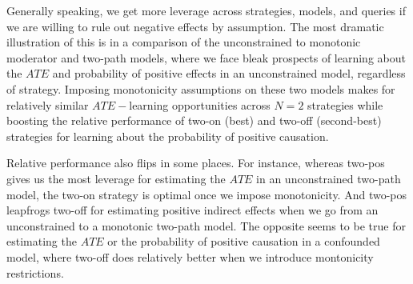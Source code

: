 \documentclass[
  12pt,
]{book}
\begin{document}
Generally speaking, we get more leverage across strategies, models, and queries if we are willing to rule out negative effects by assumption. The most dramatic illustration of this is in a comparison of the unconstrained to monotonic moderator and two-path models, where we face bleak prospects of learning about the \(ATE\) and probability of positive effects in an unconstrained model, regardless of strategy. Imposing monotonicity assumptions on these two models makes for relatively similar \(ATE-\)learning opportunities across \(N=2\) strategies while boosting the relative performance of two-on (best) and two-off (second-best) strategies for learning about the probability of positive causation.

Relative performance also flips in some places. For instance, whereas two-pos gives us the most leverage for estimating the \(ATE\) in an unconstrained two-path model, the two-on strategy is optimal once we impose monotonicity. And two-pos leapfrogs two-off for estimating positive indirect effects when we go from an unconstrained to a monotonic two-path model. The opposite seems to be true for estimating the \(ATE\) or the probability of positive causation in a confounded model, where two-off does relatively better when we introduce montonicity restrictions.

  
\end{document}
